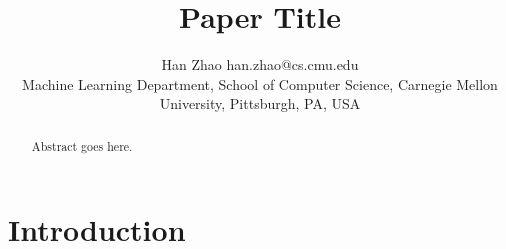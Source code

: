 \documentclass[twoside,11pt]{article}
\theoremstyle{definition}
\begin{document}
\title{Paper Title}
\author{\name Han Zhao \email han.zhao@cs.cmu.edu \\
       \addr Machine Learning Department, School of Computer Science, Carnegie Mellon University, Pittsburgh, PA, USA}
\maketitle

\begin{abstract}%
Abstract goes here.
\end{abstract}


\section{Introduction}
  

{}


\end{document}
